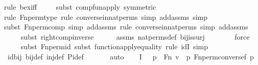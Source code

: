 \begin{isabellebody}
{\isacharparenleft}{\kern0pt}rule\ bex{\isacharunderscore}{\kern0pt}iff{\isacharparenright}{\kern0pt}\isanewline
\ \ \ \ \isamarkupfalse%
{\isacharparenleft}{\kern0pt}subst\ comp{\isacharunderscore}{\kern0pt}fun{\isacharunderscore}{\kern0pt}apply\ {\isacharbrackleft}{\kern0pt}symmetric{\isacharbrackright}{\kern0pt}{\isacharparenright}{\kern0pt}\isanewline
\ \ \ \ \ \ \isamarkupfalse%
{\isacharparenleft}{\kern0pt}rule\ Fn{\isacharunderscore}{\kern0pt}perm{\isacharprime}{\kern0pt}{\isacharunderscore}{\kern0pt}type{\isacharcomma}{\kern0pt}\ rule\ converse{\isacharunderscore}{\kern0pt}in{\isacharunderscore}{\kern0pt}nat{\isacharunderscore}{\kern0pt}perms{\isacharcomma}{\kern0pt}\ simp\ add{\isacharcolon}{\kern0pt}assms{\isacharcomma}{\kern0pt}\ simp{\isacharparenright}{\kern0pt}\isanewline
\ \ \ \ \isamarkupfalse%
{\isacharparenleft}{\kern0pt}subst\ Fn{\isacharunderscore}{\kern0pt}perm{\isacharprime}{\kern0pt}{\isacharunderscore}{\kern0pt}comp{\isacharcomma}{\kern0pt}\ simp\ add{\isacharcolon}{\kern0pt}assms{\isacharcomma}{\kern0pt}\ rule\ converse{\isacharunderscore}{\kern0pt}in{\isacharunderscore}{\kern0pt}nat{\isacharunderscore}{\kern0pt}perms{\isacharcomma}{\kern0pt}\ simp\ add{\isacharcolon}{\kern0pt}assms{\isacharparenright}{\kern0pt}\isanewline
\ \ \ \ \isamarkupfalse%
{\isacharparenleft}{\kern0pt}subst\ right{\isacharunderscore}{\kern0pt}comp{\isacharunderscore}{\kern0pt}inverse{\isacharparenright}{\kern0pt}\isanewline
\ \ \ \ \isamarkupfalse%
\ assms\ nat{\isacharunderscore}{\kern0pt}perms{\isacharunderscore}{\kern0pt}def\ bij{\isacharunderscore}{\kern0pt}is{\isacharunderscore}{\kern0pt}surj\ \isanewline
\ \ \ \ \ \isamarkupfalse%
\ force\isanewline
\ \ \ \ \isamarkupfalse%
{\isacharparenleft}{\kern0pt}subst\ Fn{\isacharunderscore}{\kern0pt}perm{\isacharprime}{\kern0pt}{\isacharunderscore}{\kern0pt}id{\isacharcomma}{\kern0pt}\ subst\ function{\isacharunderscore}{\kern0pt}apply{\isacharunderscore}{\kern0pt}equality{\isacharcomma}{\kern0pt}\ rule\ idI{\isacharcomma}{\kern0pt}\ simp{\isacharparenright}{\kern0pt}\isanewline
\ \ \ \ \isamarkupfalse%
\ id{\isacharunderscore}{\kern0pt}bij\ bij{\isacharunderscore}{\kern0pt}def\ inj{\isacharunderscore}{\kern0pt}def\ Pi{\isacharunderscore}{\kern0pt}def\ \isanewline
\ \ \ \ \isamarkupfalse%
\ auto\isanewline
\ \ \isamarkupfalse%
\ I{}{\isacharcolon}{\kern0pt}\ {\isachardoublequoteopen}{\isachardot}{\kern0pt}{\isachardot}{\kern0pt}{\isachardot}{\kern0pt}\ {\isasymlongleftrightarrow}\ {\isacharparenleft}{\kern0pt}{\isasymexists}p{\isacharprime}{\kern0pt}\ {\isasymin}\ Fn{\isachardot}{\kern0pt}\ v\ {\isacharequal}{\kern0pt}\ {\isacharless}{\kern0pt}p{\isacharprime}{\kern0pt}{\isacharcomma}{\kern0pt}\ Fn{\isacharunderscore}{\kern0pt}perm{\isacharparenleft}{\kern0pt}converse{\isacharparenleft}{\kern0pt}f{\isacharparenright}{\kern0pt}{\isacharcomma}{\kern0pt}\ p{\isacharprime}{\kern0pt}{\isacharparenright}{\kern0pt}{\isachargreater}{\kern0pt}{\isacharparenright}{\kern0pt}{\isachardoublequoteclose}\isanewline

\end{isabellebody}
